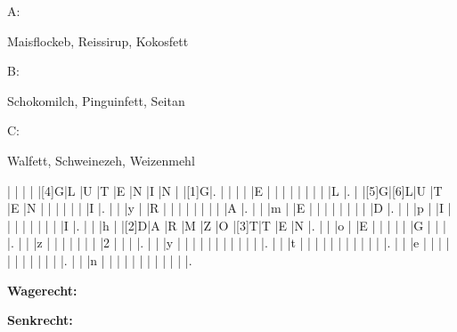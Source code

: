 \documentclass[11pt,twoside,a4paper]{exam}
\begin{document}
\begin{questions}
\begin{minipage}[t]{0.3\textwidth}
 A:

 Maisflockeb, Reissirup, Kokosfett
\end{minipage}
\begin{minipage}[t]{0.3\textwidth}
 B: 

 Schokomilch, Pinguinfett, Seitan
\end{minipage}
\begin{minipage}[t]{0.3\textwidth}
 C:

 Walfett, Schweinezeh, Weizenmehl
\end{minipage}


\vspace{0.4in}
\begin{Puzzle}{15}{15}
  |{}  |{}  |{}  |{}  |[4]G|L   |U   |T   |E   |N   |I   |N   |{}  |[1]G|.
  |{}  |{}  |{}  |{}  |E   |{}  |{}  |{}  |{}  |{}  |{}  |{}  |{}  |L   |.
  |{}  |[5]G|[6]L|U   |T   |E   |N   |{}  |{}  |{}  |{}  |{}  |{}  |I   |.
  |{}  |{}  |y   |{}  |R   |{}  |{}  |{}  |{}  |{}  |{}  |{}  |{}  |A   |.
  |{}  |{}  |m   |{}  |E   |{}  |{}  |{}  |{}  |{}  |{}  |{}  |{}  |D   |.
  |{}  |{}  |p   |{}  |I   |{}  |{}  |{}  |{}  |{}  |{}  |{}  |{}  |I   |.
  |{}  |{}  |h   |{}  |[2]D|A   |R   |M   |Z   |O   |[3]T|T   |E   |N   |.
  |{}  |{}  |o   |{}  |E   |{}  |{}  |{}  |{}  |{}  |G   |{}  |{}  |{}  |.
  |{}  |{}  |z   |{}  |{}  |{}  |{}  |{}  |{}  |{}  |2   |{}  |{}  |{}  |.
  |{}  |{}  |y   |{}  |{}  |{}  |{}  |{}  |{}  |{}  |{}  |{}  |{}  |{}  |.
  |{}  |{}  |t   |{}  |{}  |{}  |{}  |{}  |{}  |{}  |{}  |{}  |{}  |{}  |.
  |{}  |{}  |e   |{}  |{}  |{}  |{}  |{}  |{}  |{}  |{}  |{}  |{}  |{}  |.
  |{}  |{}  |n   |{}  |{}  |{}  |{}  |{}  |{}  |{}  |{}  |{}  |{}  |{}  |.
\end{Puzzle}
\begin{PuzzleClues}{\textbf{Wagerecht:}}
\end{PuzzleClues}
\begin{PuzzleClues}{\textbf{Senkrecht:}}
\end{PuzzleClues}
\end{questions}
\end{document}
